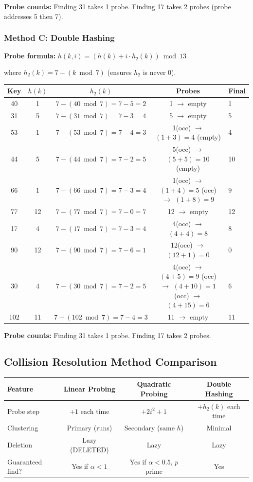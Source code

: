 \documentclass[12pt,portrait]{article}
\begin{document}
\textbf{Probe counts:} Finding 31 takes 1 probe. Finding 17 takes 2 probes (probe addresses 5 then 7).

\subsubsection{Method C: Double Hashing}

\textbf{Probe formula:} $h(k, i) = (h(k) + i \cdot h_2(k)) \bmod 13$

where $h_2(k) = 7 - (k \bmod 7)$ (ensures $h_2$ is never 0).

{\small
\begin{center}
\begin{tabular}{c|c|c|c|l}
\toprule
\textbf{Key} & $h(k)$ & $h_2(k)$ & \textbf{Probes} & \textbf{Final} \\
\midrule
40 & 1 & $7-(40\bmod7)=7-5=2$ & 1 $\to$ empty & 1 \\
31 & 5 & $7-(31\bmod7)=7-3=4$ & 5 $\to$ empty & 5 \\
53 & 1 & $7-(53\bmod7)=7-4=3$ & 1(occ) $\to$ $(1+3)=4$ (empty) & 4 \\
44 & 5 & $7-(44\bmod7)=7-2=5$ & 5(occ) $\to$ $(5+5)=10$ (empty) & 10 \\
66 & 1 & $7-(66\bmod7)=7-3=4$ & 1(occ) $\to$ $(1+4)=5$ (occ) $\to$ $(1+8)=9$ & 9 \\
77 & 12 & $7-(77\bmod7)=7-0=7$ & 12 $\to$ empty & 12 \\
17 & 4 & $7-(17\bmod7)=7-3=4$ & 4(occ) $\to$ $(4+4)=8$ & 8 \\
90 & 12 & $7-(90\bmod7)=7-6=1$ & 12(occ) $\to$ $(12+1)=0$ & 0 \\
30 & 4 & $7-(30\bmod7)=7-2=5$ & 4(occ) $\to$ $(4+5)=9$ (occ) $\to$ $(4+10)=1$ (occ) $\to$ $(4+15)=6$ & 6 \\
102 & 11 & $7-(102\bmod7)=7-4=3$ & 11 $\to$ empty & 11 \\
\bottomrule
\end{tabular}
\end{center}
}

\textbf{Probe counts:} Finding 31 takes 1 probe. Finding 17 takes 2 probes.

\subsection{Collision Resolution Method Comparison}

\begin{center}
\begin{tabular}{l|c|c|c}
\toprule
\textbf{Feature} & \textbf{Linear Probing} & \textbf{Quadratic Probing} & \textbf{Double Hashing} \\
\midrule
Probe step & $+1$ each time & $+2i^2+1$ & $+h_2(k)$ each time \\
Clustering & Primary (runs) & Secondary (same $h$) & Minimal \\
Deletion & Lazy (DELETED) & Lazy & Lazy \\
Guaranteed find? & Yes if $\alpha<1$ & Yes if $\alpha<0.5$, $p$ prime & Yes \\
\bottomrule
\end{tabular}
\end{center}
\end{document}
